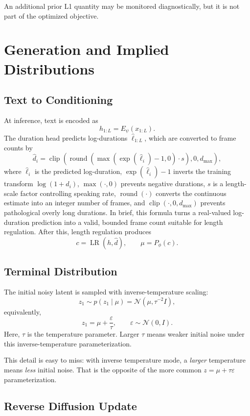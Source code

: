 \documentclass[11pt,a4paper]{article}
\begin{document}
An additional prior L1 quantity may be monitored diagnostically, but it is not part of the optimized objective.

\section{Generation and Implied Distributions}

\subsection{Text to Conditioning}

At inference, text is encoded as
\[
h_{1:L} = E_{\psi}(x_{1:L}).
\]
The duration head predicts log-durations $\hat{\ell}_{1:L}$, which are converted to frame counts by
\[
\hat{d}_i
=
\operatorname{clip}
\left(
\operatorname{round}\!\left(
\max(\exp(\hat{\ell}_i)-1,0)\cdot s
\right),
0,d_{\max}
\right),
\]
where $\hat{\ell}_i$ is the predicted log-duration, $\exp(\hat{\ell}_i)-1$ inverts the training transform $\log(1+d_i)$, $\max(\cdot,0)$ prevents negative durations, $s$ is a length-scale factor controlling speaking rate, $\operatorname{round}(\cdot)$ converts the continuous estimate into an integer number of frames, and $\operatorname{clip}(\cdot,0,d_{\max})$ prevents pathological overly long durations. In brief, this formula turns a real-valued log-duration prediction into a valid, bounded frame count suitable for length regulation. After this, length regulation produces
\[
c = \operatorname{LR}(h,\hat{d}),
\qquad
\mu = P_{\phi}(c).
\]

\subsection{Terminal Distribution}

The initial noisy latent is sampled with inverse-temperature scaling:
\[
z_1 \sim p(z_1 \mid \mu)
=
\mathcal{N}\!\left(\mu,\tau^{-2}I\right),
\]
equivalently,
\[
z_1 = \mu + \frac{\varepsilon}{\tau}, \qquad \varepsilon\sim\mathcal{N}(0,I).
\]
Here, $\tau$ is the temperature parameter. Larger $\tau$ means weaker initial noise under this inverse-temperature parameterization.

This detail is easy to miss: with inverse temperature mode, a \emph{larger} temperature means \emph{less} initial noise. That is the opposite of the more common $z=\mu+\tau\varepsilon$ parameterization.

\subsection{Reverse Diffusion Update}
\end{document}
